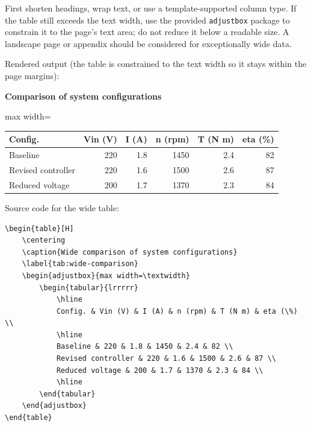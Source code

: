 {

First shorten headings, wrap text, or use a template-supported
column type. If the table still exceeds the text width, use the
provided \verb|adjustbox| package to constrain it to the page's text
area; do not reduce it below a readable size. A landscape page or
appendix should be considered for exceptionally wide data.

\RegExample Rendered output (the table is constrained to the text
width so it stays within the page margins):

\begin{center}
\textbf{Comparison of system configurations}\par\smallskip
\begin{adjustbox}{max width=\textwidth}
    \begin{tabular}{|l|r|r|r|r|r|}
        \hline
        Config. & Vin (V) & I (A) & n (rpm) & T (N m) & eta (\%) \\
        \hline
        Baseline & 220 & 1.8 & 1450 & 2.4 & 82 \\
        Revised controller & 220 & 1.6 & 1500 & 2.6 & 87 \\
        Reduced voltage & 200 & 1.7 & 1370 & 2.3 & 84 \\
        \hline
    \end{tabular}
\end{adjustbox}
\end{center}

Source code for the wide table:

\begin{verbatim}
\begin{table}[H]
    \centering
    \caption{Wide comparison of system configurations}
    \label{tab:wide-comparison}
    \begin{adjustbox}{max width=\textwidth}
        \begin{tabular}{lrrrrr}
            \hline
            Config. & Vin (V) & I (A) & n (rpm) & T (N m) & eta (\%) \\
            \hline
            Baseline & 220 & 1.8 & 1450 & 2.4 & 82 \\
            Revised controller & 220 & 1.6 & 1500 & 2.6 & 87 \\
            Reduced voltage & 200 & 1.7 & 1370 & 2.3 & 84 \\
            \hline
        \end{tabular}
    \end{adjustbox}
\end{table}
\end{verbatim}

}
